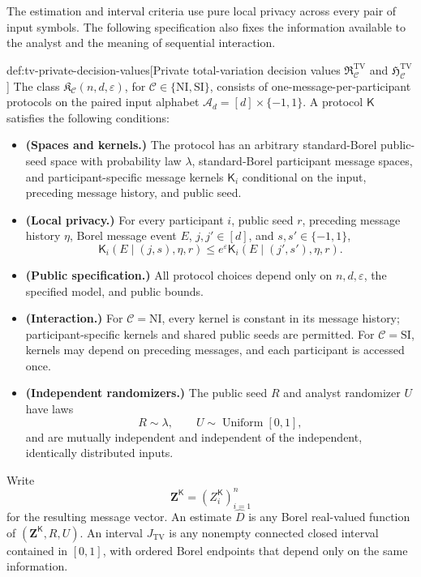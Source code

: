 The estimation and interval criteria use pure local privacy across every pair of input symbols. The following specification also fixes the information available to the analyst and the meaning of sequential interaction.

\begin{definitionv}{def:tv-private-decision-values}[Private total-variation decision values $\mathfrak R^{\mathrm{TV}}_{\mathcal C}$ and $\mathfrak H^{\mathrm{TV}}_{\mathcal C}$]
The class \(\mathfrak K_{\mathcal C}(n,d,\varepsilon)\), for \(\mathcal C\in\{\mathrm{NI},\mathrm{SI}\}\), consists of one-message-per-participant protocols on the paired input alphabet \(\mathcal A_d=[d]\times\{-1,1\}\). A protocol \(\mathsf K\) satisfies the following conditions:
\begin{itemize}
\item \textbf{(Spaces and kernels.)} The protocol has an arbitrary standard-Borel public-seed space with probability law \(\lambda\), standard-Borel participant message spaces, and participant-specific message kernels \(\mathsf K_i\) conditional on the input, preceding message history, and public seed.
\item \textbf{(Local privacy.)} For every participant \(i\), public seed \(r\), preceding message history \(\eta\), Borel message event \(E\), \(j,j'\in[d]\), and \(s,s'\in\{-1,1\}\),
\[
\mathsf K_i(E\mid(j,s),\eta,r)
\le e^\varepsilon\mathsf K_i(E\mid(j',s'),\eta,r).
\]
\item \textbf{(Public specification.)} All protocol choices depend only on \(n,d,\varepsilon\), the specified model, and public bounds.
\item \textbf{(Interaction.)} For \(\mathcal C=\mathrm{NI}\), every kernel is constant in its message history; participant-specific kernels and shared public seeds are permitted. For \(\mathcal C=\mathrm{SI}\), kernels may depend on preceding messages, and each participant is accessed once.
\item \textbf{(Independent randomizers.)} The public seed \(R\) and analyst randomizer \(U\) have laws
\[
R\sim\lambda,
\qquad
U\sim\operatorname{Uniform}[0,1],
\]
and are mutually independent and independent of the independent, identically distributed inputs.
\end{itemize}

Write
\[
\mathbf Z^{\mathsf K}=(Z_i^{\mathsf K})_{i=1}^n
\]
for the resulting message vector. An estimate \(\widehat D\) is any Borel real-valued function of \((\mathbf Z^{\mathsf K},R,U)\). An interval \(J_{\mathrm{TV}}\) is any nonempty connected closed interval contained in \([0,1]\), with ordered Borel endpoints that depend only on the same information.


\end{definitionv}
